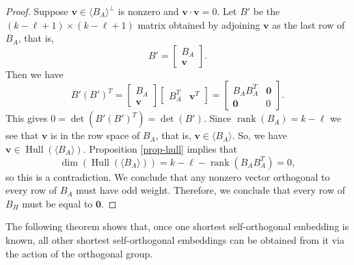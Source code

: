 \documentclass{article}
\theoremstyle{definition}
\theoremstyle{remark}
\newcommand{\Hull}{\operatorname{Hull}}
\newcommand{\rank}{\operatorname{rank}}
\begin{document}
\begin{proof}
    Suppose $\mathbf{v}\in \langle B_A\rangle^\perp$ is nonzero and $\mathbf{v}\cdot\mathbf{v}=0$. Let $B'$ be the $(k-\ell+1)\times (k-\ell+1)$ matrix obtained by adjoining $\mathbf{v}$ as the last row of $B_A$, that is,
    \[
    B'=\begin{bmatrix}
        B_A\\\mathbf{v}
    \end{bmatrix}.
    \]
    Then we have
    \[
    B'(B')^T=\begin{bmatrix}
        B_A\\\mathbf{v}
    \end{bmatrix}\begin{bmatrix}
        B_A^T & \mathbf{v}^T
    \end{bmatrix}=
    \begin{bmatrix}
        B_AB_A^T & \mathbf{0}\\\mathbf{0} & 0
    \end{bmatrix}.
    \]
    This gives $0=\det(B'(B')^T)=\det(B')$.  Since $\rank(B_A) = k-\ell$ we see that $\mathbf{v}$ is in the row space of $B_A$, that is, $\mathbf{v}\in \langle B_A\rangle$. So, we have $\mathbf{v}\in \Hull(\langle B_A\rangle)$. Proposition \ref{prop-hull} implies that
    \[
    \dim(\Hull(\langle B_A\rangle))=k-\ell-\operatorname{rank}(B_AB_A^T)=0,
    \]
    so this is a contradiction. We conclude that any nonzero vector orthogonal to every row of $B_A$ must have odd weight. Therefore, we conclude that every row of $B_H$ must be equal to $\mathbf{0}$.
\end{proof}

The following theorem shows that, once one shortest self-orthogonal embedding is known, all other shortest self-orthogonal embeddings can be obtained from it via the action of the orthogonal group.
\end{document}
